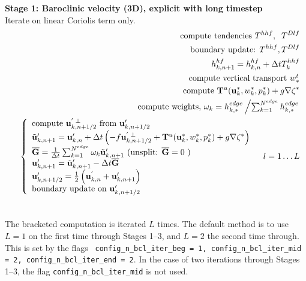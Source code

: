 \documentclass[11pt]{report}
\begin{document}
{\bf Stage 1: Baroclinic velocity (3D), explicit with long timestep}\\
Iterate on linear Coriolis term only.
\begin{eqnarray} &&
\mbox{compute tendencies } T^{hhf}, \;\;T^{Dlf} \\ &&
\mbox{boundary update: } T^{hhf},T^{Dlf}\\&&
h^{hf}_{k,n+1} = h^{hf}_{k,n} + \Delta t T^{hhf}_k \\ &&
\mbox{compute vertical transport $w^t_*$} \\ &&
\mbox{compute } {\bf T}^u({\bf u}_k^*,w_k^*,p_k^*) +g\nabla \zeta^* \\ &&
\mbox{compute weights, }\omega_k  =  h_{k,*}^{edge}
\left/\textstyle\sum_{k=1}^{N^{edge}} h_{k,*}^{edge}
\right.\\ &&
\left\{\begin{array}{l} \label{u bcl s2} 
\mbox{compute }{\bf u}_{k,n+1/2}^{'\;\perp}\mbox{ from }{\bf u}_{k,n+1/2}'\\ 
{\tilde {\bf u}}'_{k,n+1} = {\bf u}'_{k,n} + \Delta t 
\left( -f{\bf u}_{k,n+1/2}^{'\;\perp} + {\bf T}^u({\bf u}_k^*,w_k^*,p_k^*) 
+g\nabla \zeta^* \right)
\\  
{\overline {\bf G}} = 
\frac{1}{\Delta t}
\sum_{k=1}^{N^{edge}} \omega_k {\tilde {\bf u}}'_{k,n+1}
\mbox{ (unsplit: ${\overline {\bf G}} =0$ )}
\\ 
{\bf u}'_{k,n+1} = {\tilde {\bf u}}'_{k,n+1} - \Delta t {\overline {\bf G}}
\\
{\bf u}'_{k,n+1/2} = \frac{1}{2}\left({\bf u}^{'}_{k,n} +{\bf u}'_{k,n+1}\right) 
\\
\mbox{boundary update on }{\bf u}'_{k,n+1/2}
\end{array}
\right. \;\;\; l=1\ldots L \\ &&
\end{eqnarray}

The bracketed computation is iterated $L$ times.  The default method is to use $L=1$ on the first time through Stages 1--3, and $L=2$ the second time through.  This is set by the flags {\tt
config\_n\_bcl\_iter\_beg = 1, config\_n\_bcl\_iter\_mid = 2, config\_n\_bcl\_iter\_end = 2}.
In the case of two iterations through Stages 1--3, the flag {\tt config\_n\_bcl\_iter\_mid} is not used.
\end{document}
